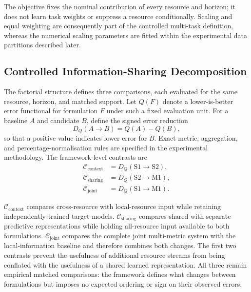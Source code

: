 \documentclass[a4paper,fleqn]{cas-dc}
\begin{document}
The objective fixes the nominal contribution of every resource and horizon; it
does not learn task weights or suppress a resource conditionally. Scaling and
equal weighting are consequently part of the controlled multi-task definition,
whereas the numerical scaling parameters are fitted within the experimental
data partitions described later.

\subsection{Controlled Information-Sharing Decomposition}
\label{sec:decomposition}

The factorial structure defines three comparisons, each evaluated for the same
resource, horizon, and matched support. Let $Q(F)$ denote a lower-is-better
error functional for formulation $F$ under such a fixed evaluation unit. For
a baseline $A$ and candidate $B$, define the signed error reduction
\begin{equation}
  D_Q(A\rightarrow B)=Q(A)-Q(B),
  \label{eq:controlled-reduction}
\end{equation}
so that a positive value indicates lower error for $B$. Exact metric,
aggregation, and percentage-normalisation rules are specified in the
experimental methodology. The framework-level contrasts are
\begin{equation}
  \begin{aligned}
    \mathcal{C}_{\mathrm{context}}
      &= D_Q(\mathrm{S1}\rightarrow\mathrm{S2}), \\
    \mathcal{C}_{\mathrm{sharing}}
      &= D_Q(\mathrm{S2}\rightarrow\mathrm{M1}), \\
    \mathcal{C}_{\mathrm{joint}}
      &= D_Q(\mathrm{S1}\rightarrow\mathrm{M1}).
  \end{aligned}
  \label{eq:controlled-contrasts}
\end{equation}

$\mathcal{C}_{\mathrm{context}}$ compares cross-resource with local-resource
input while retaining independently trained target models.
$\mathcal{C}_{\mathrm{sharing}}$ compares shared with separate predictive
representations while holding all-resource input available to both
formulations. $\mathcal{C}_{\mathrm{joint}}$ compares the complete joint
multi-metric system with the local-information baseline and therefore combines
both changes. The first two contrasts prevent the usefulness of additional
resource streams from being conflated with the usefulness of a shared learned
representation. All three remain empirical matched comparisons: the framework
defines what changes between formulations but imposes no expected ordering or
sign on their observed errors.
\end{document}
